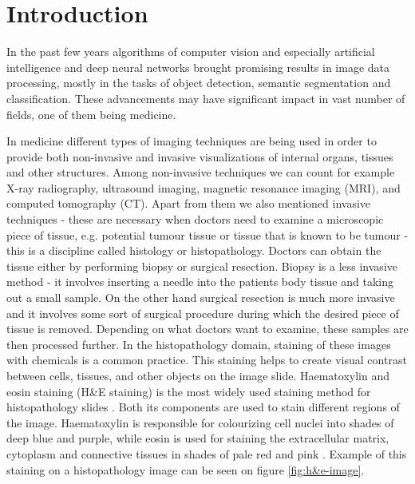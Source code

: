 \chapter{Introduction}


In the past few years algorithms of computer vision and especially artificial intelligence and deep neural networks brought promising results in image data processing, mostly in the tasks of object detection, semantic segmentation and classification. These advancements may have significant impact in vast number of fields, one of them being medicine. 

In medicine different types of imaging techniques are being used in order to provide both non-invasive and invasive visualizations of internal organs, tissues and other structures. Among non-invasive techniques we can count for example X-ray radiography, ultrasound imaging, magnetic resonance imaging (MRI), and computed tomography (CT). Apart from them we also mentioned invasive techniques - these are necessary when doctors need to examine a microscopic piece of tissue, e.g. potential tumour tissue or tissue that is known to be tumour - this is a discipline called histology or histopathology. Doctors can obtain the tissue either by performing biopsy or surgical resection. Biopsy is a less invasive method - it involves inserting a needle into the patients body tissue and taking out a small sample. On the other hand surgical resection is much more invasive and it involves some sort of surgical procedure during which the desired piece of tissue is removed. Depending on what doctors want to examine, these samples are then processed further. In the histopathology domain, staining of these images with chemicals is a common practice. This staining helps to create visual contrast between cells, tissues, and other objects on the image slide. Haematoxylin and eosin staining (H\&E staining) is the most widely used staining method for histopathology slides \cite{Dey2022}. Both its components are used to stain different regions of the image. Haematoxylin is responsible for colourizing cell nuclei into shades of deep blue and purple, while eosin is used for staining the extracellular matrix, cytoplasm and connective tissues in shades of pale red and pink \cite{Dey2022}. Example of this staining on a histopathology image can be seen on figure \ref{fig:h&e-image}.

